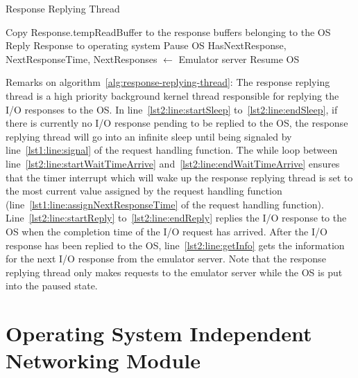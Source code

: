 \begin{algorithm}
	\small
	\newcommand*\Let[2]{\State #1 $\gets$ #2}
	\caption{Response Replying Thread
		\label{alg:response-replying-thread}}
	\begin{algorithmic}[1]
		\Repeat
		 \label{lst2:line:startSleep}
		\EndIf \label{lst2:line:endSleep}
		\Repeat \label{lst2:line:startWaitTimeArrive}
		 \label{lst2:line:endWaitTimeArrive}
		 \label{lst2:line:startReply}
				\State Copy Response.tempReadBuffer to the response buffers belonging to the OS
			\EndIf
			\State Reply Response to operating system
		\EndFor \label{lst2:line:endReply}
		\State Pause OS
		\Let{HasNextResponse, NextResponseTime, NextResponses}{Emulator server} \label{lst2:line:getInfo}
		\State Resume OS
	\end{algorithmic}
	\bigskip
\end{algorithm}

Remarks on algorithm~\ref{alg:response-replying-thread}: The response replying thread is a high priority background kernel thread responsible for replying the I/O responses to the OS. In line~\ref{lst2:line:startSleep} to~\ref{lst2:line:endSleep}, if there is currently no I/O response pending to be replied to the OS, the response replying thread will go into an infinite sleep until being signaled by line~\ref{lst1:line:signal} of the request handling function. The while loop between line~\ref{lst2:line:startWaitTimeArrive} and~\ref{lst2:line:endWaitTimeArrive} ensures that the timer interrupt which will wake up the response replying thread is set to the most current value assigned by the request handling function (line~\ref{lst1:line:assignNextResponseTime} of the request handling function). Line~\ref{lst2:line:startReply} to~\ref{lst2:line:endReply} replies the I/O response to the OS when the completion time of the I/O request has arrived. After the I/O response has been replied to the OS, line~\ref{lst2:line:getInfo} gets the information for the next I/O response from the emulator server. Note that the response replying thread only makes requests to the emulator server while the OS is put into the paused state.

\section{Operating System Independent Networking Module}
\label{sec:ch6-6.5}

